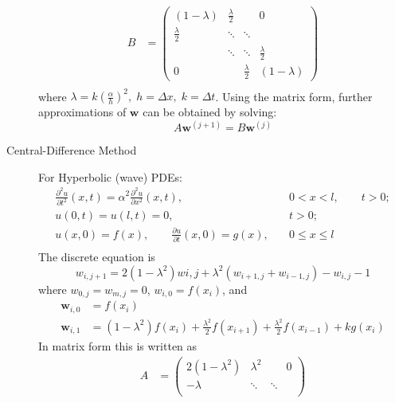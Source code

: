 \documentclass[8pt]{article}
\begin{document}
\begin{multicols}{2}
\begin{description}
\begin{equation*}
\begin{aligned}
        B&=
        \begin{pmatrix}
          (1-\lambda) & \frac{\lambda}{2} & & 0\\
          \frac{\lambda}{2} & \ddots & \ddots & \\
          & \ddots & \ddots & \frac{\lambda}{2}\\
          0 & & \frac{\lambda}{2} & (1-\lambda)
        \end{pmatrix} \\
      \end{aligned}
    \end{equation*}
    where $\lambda = k\left(\frac{\alpha}{h}\right)^2,\;h=\Delta
    x,\;k=\Delta t$. Using the matrix form, further approximations of
    $\mathbf{w}$ can be obtained by solving:
    $$ A\mathbf{w}^{(j+1)} = B\mathbf{w}^{(j)} $$
  \item[Central-Difference Method] For Hyperbolic (wave) PDEs:
    \begin{equation*}
      \begin{aligned}
        &\frac{\partial^2u}{\partial t^2}(x,t) =
        \alpha^2\frac{\partial^2u}{\partial x^2}(x,t),
        &0<x<l, \qquad t>0; \\
        &u(0,t)=u(l,t)=0,\quad &t>0; \\
        &u(x,0)=f(x),\qquad \frac{\partial u}{\partial t}(x,0)=g(x), \quad &0\leq x\leq
        l& \\ 
      \end{aligned}
    \end{equation*}
    The discrete equation is 
    $$ w_{i,j+1} = 2(1-\lambda^2)w{i,j} + \lambda^2(w_{i+1,j}+w_{i-1,j})-w_{i,j}-1 $$
    where $w_{0,j}=w_{m,j}=0$, $w_{i,0}=f(x_i)$, and 
    \begin{equation*}
      \begin{aligned}
        \mathbf{w}_{i,0} &= f(x_i) \\
        \mathbf{w}_{i,1} &=
        (1-\lambda^2)f(x_i)+\frac{\lambda^2}{2}f(x_{i+1}) +
        \frac{\lambda^2}{2}f(x_{i-1}) + kg(x_i)
      \end{aligned}
    \end{equation*}
    In matrix form this is written as
    \begin{equation*}
      \begin{aligned}
        A&=
        \begin{pmatrix}
            2(1-\lambda^2) & \lambda^2 & & 0\\
            -\lambda& \ddots & \ddots & \\

\end{pmatrix}
\end{aligned}
\end{equation*}
\end{description}
\end{multicols}
\end{document}
